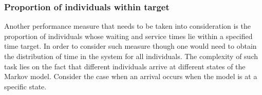 \subsubsection{Proportion of individuals within target}

Another performance measure that needs to be taken into consideration is the 
proportion of individuals whose waiting and service times lie within a specified 
time target.
In order to consider such measure though one would need to obtain the 
distribution of time in the system for all individuals. 
The complexity of such task lies on the fact that different individuals arrive 
at different states of the Markov model. 
Consider the case when an arrival occurs when the model is at a specific state.


%         



